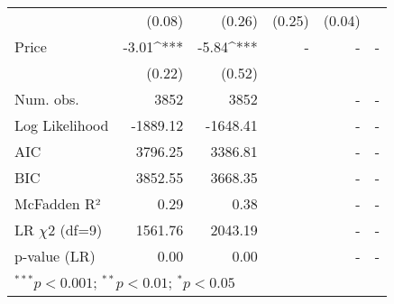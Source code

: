 \begin{table}[h]
\begin{center}
\begin{tabular}{l D{.}{.}{5.5} D{.}{.}{5.5} D{.}{.}{2.5} D{.}{.}{2.5} D{.}{.}{3.2}}
                                   & (0.08)      & (0.26)      & (0.25)      & (0.04)     &        \\
Price                              & -3.01^{***} & -5.84^{***} &  -          &  -         &  -     \\
                                   & (0.22)      & (0.52)      &             &            &        \\
\midrule
Num. obs.                          & 3852        & 3852        &             & -          &  -     \\
Log Likelihood                     & -1889.12    & -1648.41    &             & -          &  -     \\
AIC                                & 3796.25     & 3386.81     &             & -          &  -     \\
BIC                                & 3852.55     & 3668.35     &             & -          &  -     \\
McFadden R²                        & 0.29        & 0.38        &             & -          &  -     \\
LR $\chi 2$ (df=9)                       & 1561.76     & 2043.19     &             & -          &  -     \\
p-value (LR)                       & 0.00        & 0.00        &             & -          &  -     \\
\bottomrule
{}
\end{tabular}

\end{center}
\end{table}
